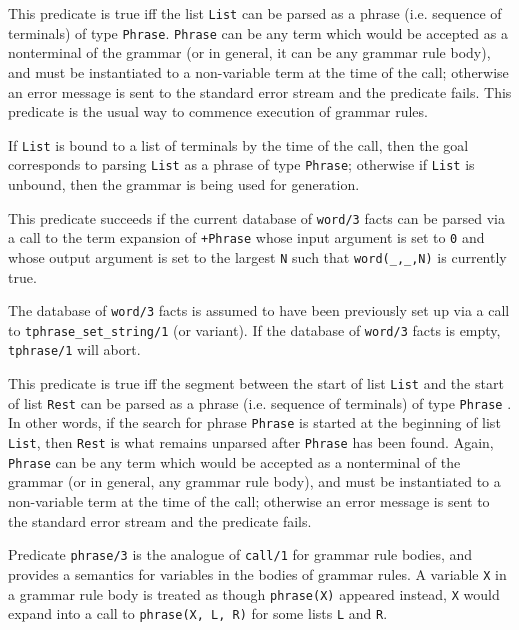 \begin{description}

    This predicate is true iff the list {\tt List} can be parsed as a phrase 
    (i.e. sequence of terminals) of type {\tt Phrase}.  {\tt Phrase} can be 
    any term which would
    be accepted as a nonterminal of the grammar (or in general, it can 
    be any  grammar rule body), and must be instantiated to a
    non-variable term  at the time of the call; otherwise an error
    message is sent to the standard error stream and the predicate fails. 
    This predicate is the usual way to commence execution of grammar rules.

    If {\tt List} is bound to a list of terminals by the time of the call,
    then the goal corresponds to parsing {\tt List} as a phrase of type
    {\tt Phrase}; otherwise if {\tt List} is unbound, then the grammar
    is being used for generation.

 This predicate
    succeeds if the current database of {\tt word/3} facts can be
    parsed via a call to the term expansion of {\tt +Phrase} whose
    input argument is set to {\tt 0} and whose output argument is set
    to the largest {\tt N} such that {\tt word(\_,\_,N)} is currently
    true.  

    The database of {\tt word/3} facts is assumed to have been
    previously set up via a call to {\tt tphrase\_set\_string/1} (or variant).  If
    the database of {\tt word/3} facts is empty, {\tt tphrase/1} will
    abort.


    This predicate is true iff the segment between the start of list 
    {\tt List} and the start of list {\tt Rest} can be parsed as a phrase 
    (i.e. sequence of terminals) of type {\tt Phrase} . In other words, if 
    the search for phrase 
    {\tt Phrase} is started at the beginning of list {\tt List}, then 
    {\tt Rest} is what remains unparsed after {\tt Phrase} has been
    found. Again, {\tt Phrase} can be any term which
    would be accepted as a nonterminal of the grammar (or in general, any
    grammar rule body), and must be instantiated to a non-variable term
    at the time of the call; otherwise an error message is sent to the
    standard error stream and the predicate fails.

    Predicate {\tt phrase/3} is the analogue of {\tt call/1} for grammar
    rule bodies, and provides a semantics for variables in the bodies of
    grammar rules.  A variable {\tt X} in a grammar rule body is treated
    as though {\tt phrase(X)} appeared instead, {\tt X} would expand into 
    a call to {\tt phrase(X, L, R)} for some lists {\tt L} and {\tt R}.  


\end{description}
